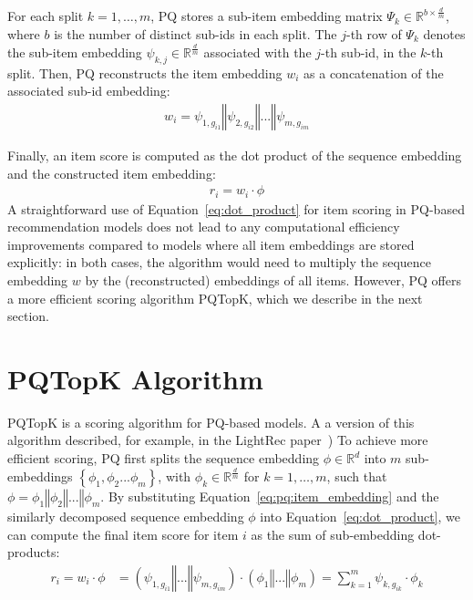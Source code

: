 \documentclass[sigconf,natbib=true, review=true]{acmart} %
\newcommand{\pageenlarge}[1]{\marginnote{}\enlargethispage{#1\baselineskip}}
\newcommand{\rsasha}[1]{\textcolor[HTML]{FF0000}{#1}}
\begin{document}
For each split $k=1,\ldots,m$, PQ stores a sub-item embedding matrix $\Psi_k \in \mathbb{R}^{b\times\frac{d}{m}}$, where $b$ is the number of distinct sub-ids in each split. The $j$-th row of $\Psi_k$ denotes the sub-item embedding $\psi_{k,j} \in \mathbb{R}^{\frac{d}{m}}$ associated with the $j$-th sub-id, in the $k$-th split.
Then, PQ reconstructs the item embedding $w_i$ as a concatenation of the associated sub-id embedding: 
\begin{align}
    w_i =  \psi_{1,g_{i1}} \mathbin\Vert \psi_{2,g_{i2}}  \mathbin\Vert ... \mathbin\Vert  \psi_{m,g_{im}} \label{eq:pq:item_embedding}
\end{align}

Finally, an item score is computed as the dot product of the sequence embedding and the constructed item embedding: 
\begin{align}
    r_i = w_i \cdot \phi\label{eq:dot_product}
\end{align}
A straightforward use of Equation~\eqref{eq:dot_product} for item scoring in PQ-based recommendation models does not lead to any computational efficiency improvements compared to models where all item embeddings are stored explicitly: \rsasha{in both cases, the algorithm would need to multiply the sequence embedding $w$  by the (reconstructed) embeddings of all items.}
However, PQ offers a more efficient scoring algorithm PQTopK, \rsasha{which we describe in the next section}. 

\section{PQTopK Algorithm} \label{sec:pq_topk}
\rsasha{PQTopK is a scoring algorithm for PQ-based models. A a version of this algorithm described, for example, in the LightRec paper~\cite{lianLightRecMemorySearchEfficient2020})}
  To achieve more efficient scoring, PQ first splits the sequence embedding $\phi \in \mathbb{R}^{d}$ into $m$ sub-embeddings $\left\{\phi_1, \phi_2 ... \phi_m\right\}$, with $\phi_{k} \in \mathbb{R}^{\frac{d}{m}}$ for $k=1, \ldots,m$, such that $\phi = \phi_1  \mathbin\Vert \phi_2  \mathbin\Vert ... \mathbin\Vert  \phi_m$.
By substituting Equation~\eqref{eq:pq:item_embedding} and the similarly decomposed sequence embedding $\phi$ into Equation~\eqref{eq:dot_product}, we can compute the final item score for item $i$ as the sum of sub-embedding dot-products: 
\begin{align}
   r_i = w_i \cdot \phi &= (\psi_{1,g_{i1}} \mathbin\Vert ... \mathbin\Vert  \psi_{m,g_{im}}) \cdot (\phi_1  \mathbin\Vert ... \mathbin\Vert  \phi_m) = \sum_{k=1}^m \psi_{k,g_{ik}} \cdot \phi_k \nonumber
\end{align}
\end{document}
